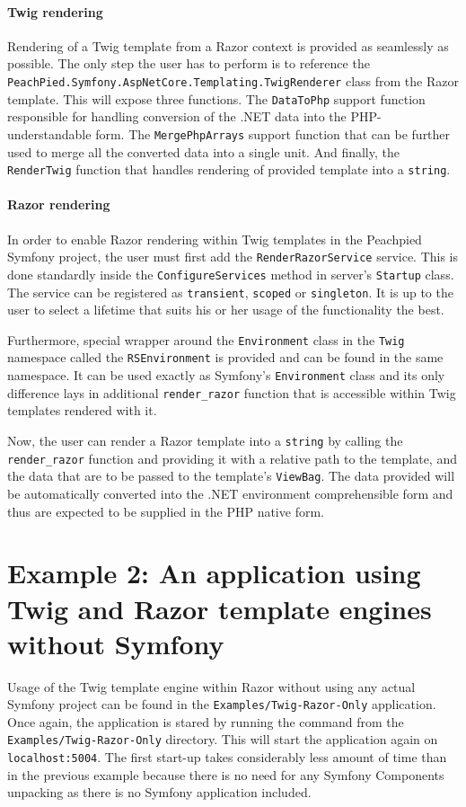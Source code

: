 \paragraph{Twig rendering} Rendering of a Twig template from a Razor context is provided as seamlessly as possible. The only step the user has to perform is to reference the \texttt{PeachPied.Symfony.AspNetCore.Templating.TwigRenderer} class from the Razor template. This will expose three functions. The \texttt{DataToPhp} support function responsible for handling conversion of the .NET data into the PHP-understandable form. The \texttt{MergePhpArrays} support function that can be further used to merge all the converted data into a single unit. And finally, the \texttt{RenderTwig} function that handles rendering of provided template into a \texttt{string}.


\paragraph{Razor rendering} In order to enable Razor rendering within Twig templates in the Peachpied Symfony project, the user must first add the \texttt{RenderRazorService} service. This is done standardly inside the \texttt{ConfigureServices} method in server's \texttt{Startup} class. The service can be registered as \texttt{transient}, \texttt{scoped} or \texttt{singleton}. It is up to the user to select a lifetime that suits his or her usage of the functionality the best. 

Furthermore, special wrapper around the \texttt{Environment} class in the \texttt{Twig} namespace called the \texttt{RSEnvironment} is provided and can be found in the same namespace. It can be used exactly as Symfony's \texttt{Environment} class and its only difference lays in additional \texttt{render\_razor} function that is accessible within Twig templates rendered with it.

Now, the user can render a Razor template into a \texttt{string} by calling the \texttt{render\_razor} function and providing it with a relative path to the template, and the data that are to be passed to the template's \texttt{ViewBag}. The data provided will be automatically converted into the .NET environment comprehensible form and thus are expected to be supplied in the PHP native form.

\section{Example 2: An application using Twig and Razor template engines without Symfony}
Usage of the Twig template engine within Razor without using any actual Symfony project can be found in the \texttt{Examples/Twig-Razor-Only} application. Once again, the application is stared by running the \noindent{} command from the \texttt{Examples/Twig-Razor-Only} directory. This will start the application again on \texttt{localhost:5004}. The first start-up takes considerably less amount of time than in the previous example because there is no need for any Symfony Components unpacking as there is no Symfony application included. 

